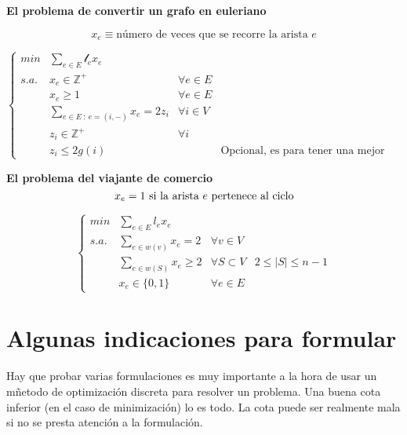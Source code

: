 \documentclass[openany]{book}
\begin{document}
\begin{exercise}
    {\color{turquoise} \textbf{El problema de convertir un grafo en euleriano}}

    $$ x_{e} \equiv \text{número de veces que se recorre la arista } e $$

    $$ \left\{
    \begin{array}{llrr}
        min & \sum\limits_{e \in E}^{} \mathcal{l}_{e}x_{e}\\
        s.a. & x_{e} \in \mathbb{Z}^{+} & \forall e \in E\\
        & x_{e} \geq 1   & \forall e \in E\\
        & \sum\limits_{e \in E\ :\ e = (i,-)}^{} x_{e} = 2z_{i} & \forall i \in V\\
        & z_i \in \mathbb{Z}^{+} & \forall i\\
        & z_i \leq 2g(i) & & \text{Opcional, es para tener una mejor formulación}
    \end{array}
    \right. $$
\end{exercise}

\begin{exercise}
    {\color{turquoise} \textbf{El problema del viajante de comercio}}
    $$ x_{e} = 1 \text{ si la arista $ e $ pertenece al ciclo} $$

    $$ \left\{
    \begin{array}{llrr}
        min & \sum\limits_{e \in E}^{} l_{e}x_{e}\\
        s.a. & \sum\limits_{e \in w(v)}^{} x_{e} = 2 & \forall v \in V\\
        & \sum\limits_{e \in w(S)}^{} x_{e} \geq 2 & \forall S \subset V & 2 \leq |S|\leq n-1 \\
        & x_{e} \in \{0,1\} & \forall e \in E
    \end{array}
    \right. $$


\end{exercise}

\section{Algunas indicaciones para formular}

Hay que probar varias formulaciones es muy importante a la hora de usar un mñetodo de optimización discreta para resolver un problema. Una buena cota inferior (en el caso de minimización) lo es todo. La cota puede ser realmente mala si no se presta atención a la formulación.
\end{document}
